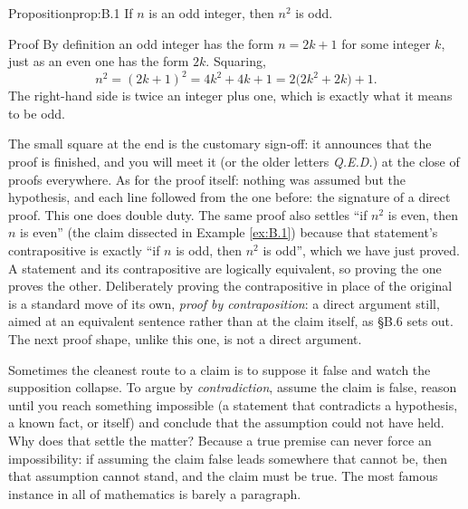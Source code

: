 \documentclass[a4paper,12pt,oneside]{memoir}
\begin{document}
\begin{envproposition}{Proposition}{prop:B.1}{}
If \(n\) is an odd integer, then \(n^{2}\) is odd.
\end{envproposition}
\begin{envproof}{Proof}{}{}
By definition an odd integer has the form \(n = 2k + 1\) for some integer \(k\), just as an even one has the form \(2k\). Squaring, \[ n^{2} = (2k + 1)^{2} = 4k^{2} + 4k + 1 = 2\bigl(2k^{2} + 2k\bigr) + 1. \] The right-hand side is twice an integer plus one, which is exactly what it means to be odd. \qedmark
\end{envproof}
The small square at the end is the customary sign-off: it announces that the proof is finished, and you will meet it (or the older letters \emph{Q.E.D.}) at the close of proofs everywhere. As for the proof itself: nothing was assumed but the hypothesis, and each line followed from the one before: the signature of a direct proof. This one does double duty. The same proof also settles “if \(n^{2}\) is even, then \(n\) is even” (the claim dissected in Example \ref{ex:B.1}) because that statement’s contrapositive is exactly “if \(n\) is odd, then \(n^{2}\) is odd”, which we have just proved. A statement and its contrapositive are logically equivalent, so proving the one proves the other. Deliberately proving the contrapositive in place of the original is a standard move of its own, \emph{proof by contraposition}: a direct argument still, aimed at an equivalent sentence rather than at the claim itself, as §B.6 sets out. The next proof shape, unlike this one, is not a direct argument.

 Sometimes the cleanest route to a claim is to suppose it false and watch the supposition collapse. To argue by \emph{contradiction}, assume the claim is false, reason until you reach something impossible (a statement that contradicts a hypothesis, a known fact, or itself) and conclude that the assumption could not have held. Why does that settle the matter? Because a true premise can never force an impossibility: if assuming the claim false leads somewhere that cannot be, then that assumption cannot stand, and the claim must be true. The most famous instance in all of mathematics is barely a paragraph.
\end{document}
